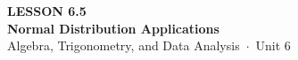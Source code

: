 \documentclass[aspectratio=169, 11pt]{beamer}
\begin{document}
{
\begin{frame}[plain]
  \vspace{2.8cm}\hspace{0.55cm}%
  \begin{minipage}{0.9\textwidth}
    {\color{goldacc}\bfseries\small LESSON 6.5}\\[0.5cm]
    {\color{white}\bfseries\LARGE Normal Distribution Applications}\\[1.2cm]
    {\color{mistmid}\small Algebra, Trigonometry, and Data Analysis~$\cdot$~Unit 6}
  \end{minipage}
\end{frame}
}

\begin{frame}[t, plain]
\end{frame}
\end{document}
